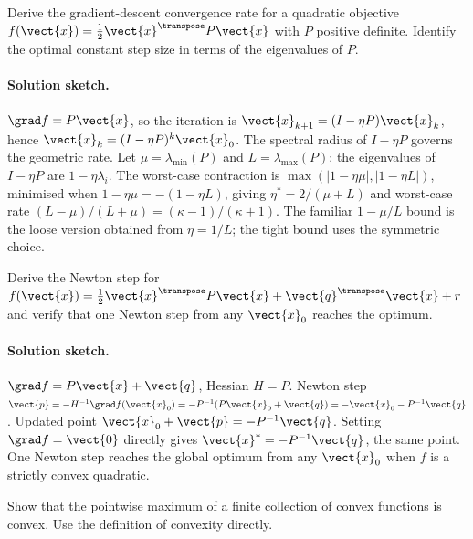 \begin{exercise}
Derive the gradient-descent convergence rate for a quadratic
objective $f(\vect{x}) = \tfrac{1}{2} \vect{x}^{\transpose} P
\vect{x}$ with $P$ positive definite. Identify the optimal
constant step size in terms of the eigenvalues of $P$.
\end{exercise}

\paragraph{Solution sketch.}
$\grad f = P \vect{x}$, so the iteration is $\vect{x}_{k+1} =
(I - \eta P) \vect{x}_{k}$, hence $\vect{x}_{k} = (I - \eta P)^{k}
\vect{x}_{0}$. The spectral radius of $I - \eta P$ governs the
geometric rate. Let $\mu = \lambda_{\min}(P)$ and $L =
\lambda_{\max}(P)$; the eigenvalues of $I - \eta P$ are $1 - \eta
\lambda_{i}$. The worst-case contraction is $\max(|1 - \eta \mu|,
|1 - \eta L|)$, minimised when $1 - \eta \mu = -(1 - \eta L)$,
giving $\eta^{*} = 2 / (\mu + L)$ and worst-case rate $(L - \mu)/
(L + \mu) = (\kappa - 1)/(\kappa + 1)$. The familiar $1 - \mu/L$
bound is the loose version obtained from $\eta = 1/L$; the tight
bound uses the symmetric choice.

\begin{exercise}
Derive the Newton step for $f(\vect{x}) = \tfrac{1}{2}
\vect{x}^{\transpose} P \vect{x} + \vect{q}^{\transpose}
\vect{x} + r$ and verify that one Newton step from any
$\vect{x}_{0}$ reaches the optimum.
\end{exercise}

\paragraph{Solution sketch.}
$\grad f = P \vect{x} + \vect{q}$, Hessian $H = P$. Newton step
$\vect{p} = -H^{-1} \grad f(\vect{x}_{0}) = -P^{-1}(P \vect{x}_{0}
+ \vect{q}) = -\vect{x}_{0} - P^{-1} \vect{q}$. Updated point
$\vect{x}_{0} + \vect{p} = -P^{-1} \vect{q}$. Setting $\grad f =
\vect{0}$ directly gives $\vect{x}^{*} = -P^{-1} \vect{q}$, the
same point. One Newton step reaches the global optimum from any
$\vect{x}_{0}$ when $f$ is a strictly convex quadratic.

\begin{exercise}
Show that the pointwise maximum of a finite collection of convex
functions is convex. Use the definition of convexity directly.
\end{exercise}

